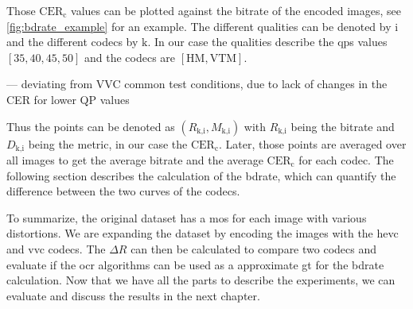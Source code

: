 Those $\text{CER}_{\text{c}}$ values can be plotted against the bitrate of the encoded images, see \autoref{fig:bdrate_example} for an example.
The different qualities can be denoted by $\text{i}$ and the different codecs by $\text{k}$.
In our case the qualities describe the \glspl{qp} values $[35, 40, 45, 50]$ and the codecs are $[\text{HM}, \text{VTM}]$.

--- deviating from VVC common test conditions, due to lack of changes in the CER for lower QP values

Thus the points can be denoted as $\left(R_{\text{k,i}}, M_{\text{k,i}}\right)$ with $R_{\text{k,i}}$ being the bitrate and $D_{\text{k,i}}$ being the metric, in our case the $\text{CER}_{\text{c}}$.
Later, those points are averaged over all images to get the average bitrate and the average $\text{CER}_{\text{c}}$ for each codec.
The following section describes the calculation of the \gls{bdrate}, which can quantify the difference between the two curves of the codecs.


To summarize, the original dataset has a \gls{mos} for each image with various distortions.
We are expanding the dataset by encoding the images with the \gls{hevc} and \gls{vvc} codecs.
The $\Delta R$ can then be calculated to compare two codecs and evaluate if the \gls{ocr} algorithms can be used as a approximate \gls{gt} for the \gls{bdrate} calculation.
Now that we have all the parts to describe the experiments, we can evaluate and discuss the results in the next chapter.
